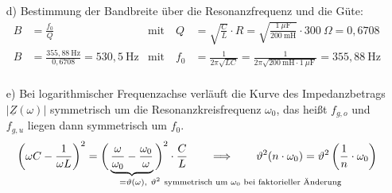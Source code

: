{\begin{itemize}
\begin{align*}
        \omega{g,o} &= 4,4556 \cdot 10^3 \mathrm{s}^{-1} \qquad f_{g,o} = 709,12\ \mathrm{Hz}\\
        \omega{g,u} &= 1,1222 \cdot 10^3 \mathrm{s}^{-1} \qquad f_{g,u} = 178,60\ \mathrm{Hz}\\[4pt]
        B &= f_{g,o} - f_{g,u} = 530,5\,\mathrm{Hz}
    \end{align*}
    \item[d)] Bestimmung der Bandbreite über die Resonanzfrequenz und die Güte:
    \begin{align*}
        B &= \frac{f_0}{Q} 
            & \text{mit}\quad Q &= \sqrt{\frac{C}{L}}\cdot R = \sqrt{\frac{1\ \mu\mathrm{F}}{200\ \mathrm{mH}}} \cdot 300\ \Omega = 0,6708 \\
        B &= \frac{355,88\ \mathrm{Hz}}{0,6708} = 530,5\ \mathrm{Hz}
            & \text{mit}\quad f_0 &= \frac{1}{2\pi\sqrt{LC}} = \frac{1}{2\pi\sqrt{200\ \mathrm{mH} \cdot 1\ \mu\mathrm{F}}} = 355,88\ \mathrm{Hz} \\ 
    \end{align*}
    \item[e)] Bei logarithmischer Frequenzachse verläuft die Kurve des Impedanzbetrags $|\underline{Z}(\omega)|$  
    symmetrisch um die Resonanzkreisfrequenz $\omega_0$, das heißt $f_{g,o}$ und $f_{g,u}$ liegen dann symmetrisch um $f_0$.
    \begin{equation*}
        \left(\omega C - \frac{1}{\omega L}\right)^2 = \bigg(\underbrace{
            \frac{\omega}{\omega_0} - \frac{\omega_0}{\omega}
        }_{=\vartheta(\omega)\mathrlap{,\ \vartheta^2\ \text{symmetrisch um }\omega_0\text{ bei faktorieller Änderung}}}
        \bigg)^2\cdot\frac{C}{L}
        \qquad \Longrightarrow \qquad \vartheta^2(n\cdot\omega_0) = \vartheta^2\left(\frac{1}{n}\cdot\omega_0\right)
    \end{equation*}
\end{itemize}
}



